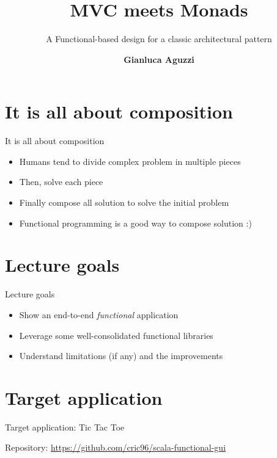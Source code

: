 \documentclass[presentation]{beamer}
\title[MVC Meets Monad]{MVC meets Monads}
\subtitle{A Functional-based design for a classic architectural pattern}
\author[G.Aguzzi]
{\textbf{Gianluca Aguzzi}}
\institute[shortinst]{\normalsize 
\textsc{Alma Mater Studiorum}--Universit\`a di Bologna, Cesena, Italy 
}
\let\oldcite\cite
\renewcommand{\cite}[1]{{\color{blue}\oldcite{#1}}}
\begin{document}

\section{It is all about composition \cite{milewski2019category}}
\begin{frame}[fragile]{It is all about composition \cite{milewski2019category}}
\begin{itemize}
\item Humans tend to divide complex problem in multiple pieces
\item Then, solve each piece
\item Finally compose all solution to solve the initial problem
\item Functional programming is a good way to compose solution :)
\end{itemize}


\section{Lecture goals}
\end{frame}
\begin{frame}[fragile]{Lecture goals}
\begin{itemize}
\item Show an end-to-end \emph{functional} application
\item Leverage some well-consolidated functional libraries
\item Understand limitations (if any) and the improvements
\end{itemize}
\end{frame}

\section{Target application}
\begin{frame}[fragile]{Target application: Tic Tac Toe}
\begin{center}
  Repository: \url{https://github.com/cric96/scala-functional-gui}
\end{center}
\end{frame}
\end{document}
